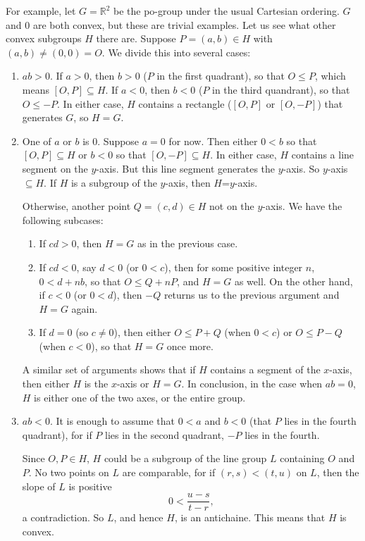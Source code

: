 \documentclass[12pt]{article}
\begin{document}
For example, let $G=\mathbb{R}^2$ be the po-group under the usual Cartesian ordering.  $G$ and $0$ are both convex, but these are trivial examples.  Let us see what other convex subgroups $H$ there are.  Suppose $P=(a,b)\in H$ with $(a,b)\ne (0,0)=O$.  We divide this into several cases:
\begin{enumerate}
\item 
$ab>0$.  If $a>0$, then $b>0$ ($P$ in the first quadrant), so that $O\le P$, which means $[O,P]\subseteq H$.  If $a<0$, then $b<0$ ($P$ in the third quandrant), so that $O\le -P$.  In either case, $H$ contains a rectangle ($[O,P]$ or $[O,-P]$) that generates $G$, so $H=G$.
\item
One of $a$ or $b$ is $0$.  Suppose $a=0$ for now.  Then either $0<b$ so that $[O,P]\subseteq H$ or $b<0$ so that $[O,-P]\subseteq H$.  In either case, $H$ contains a line segment on the $y$-axis.  But this line segment generates the $y$-axis.  So $y$-axis $\subseteq H$.  If $H$ is a subgroup of the $y$-axis, then $H$=$y$-axis.  

Otherwise, another point $Q=(c,d)\in H$ not on the $y$-axis.  We have the following subcases:
\begin{enumerate}
\item
If $cd>0$, then $H=G$ as in the previous case.  
\item
If $cd< 0$, say $d<0$ (or $0<c$), then for some positive integer $n$, $0<d+nb$, so that $O\le Q+nP$, and $H=G$ as well.  On the other hand, if $c<0$ (or $0<d$), then $-Q$ returns us to the previous argument and $H=G$ again.  
\item
If $d=0$ (so $c\ne 0$), then either $O\le P+Q$ (when $0<c$) or $O\le P-Q$ (when $c<0$), so that $H=G$ once more.
\end{enumerate}

A similar set of arguments shows that if $H$ contains a segment of the $x$-axis, then either $H$ is the $x$-axis or $H=G$.  In conclusion, in the case when $ab=0$, $H$ is either one of the two axes, or the entire group.
\item
$ab<0$.  It is enough to assume that $0<a$ and $b<0$ (that $P$ lies in the fourth quadrant), for if $P$ lies in the second quadrant, $-P$ lies in the fourth.  

Since $O,P\in H$, $H$ could be a subgroup of the line group $L$ containing $O$ and $P$.  No two points on $L$ are comparable, for if $(r,s)<(t,u)$ on $L$, then the slope of $L$ is positive $$0<\frac{u-s}{t-r},$$ a contradiction.  So $L$, and hence $H$, is an antichaine.  This means that $H$ is convex.


\end{enumerate}
\end{document}
